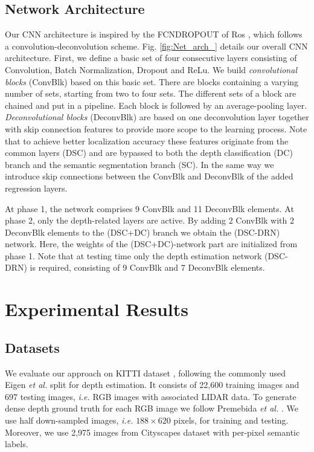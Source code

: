 \documentclass[letterpaper, 10 pt, conference]{ieeeconf}
\newcommand{\ie}{{\em i.e.}}
\newcommand{\etal}{{\em et al.}}
\newcommand{\Fig}[1]{Fig. \ref{fig:#1}}
\begin{document}
\subsection{Network Architecture}
 
Our CNN architecture is inspired by the FCNDROPOUT of Ros \cite{Ros:2016}, which follows a convolution-deconvolution scheme. \Fig{Net_arch_} details our overall CNN architecture. First, we define a basic set of four consecutive layers consisting of Convolution, Batch Normalization, Dropout and ReLu. We build \emph{convolutional blocks} (ConvBlk) based on this basic set. There are blocks containing a varying number of sets, starting from two to four sets. The different sets of a block are chained and put in a pipeline. Each block is followed by an average-pooling layer. \emph{Deconvolutional blocks} (DeconvBlk) are based on one deconvolution layer together with skip connection features to provide more scope to the  learning process. Note that to achieve better localization accuracy these features originate from the common layers (DSC) and are bypassed to both the depth classification (DC) branch and the semantic segmentation branch (SC). In the same way we introduce skip connections between the ConvBlk and DeconvBlk of the added regression layers. 

At phase 1, the network comprises 9 ConvBlk and 11 DeconvBlk elements. At phase 2, only the depth-related layers are active. By adding 2 ConvBlk with 2 DeconvBlk elements to the (DSC+DC) branch we obtain the (DSC-DRN) network. Here, the weights of the (DSC+DC)-network part are initialized from phase 1. Note that at testing time only the depth estimation network (DSC-DRN) is required, consisting of 9 ConvBlk and 7 DeconvBlk elements. 



 
\section{Experimental Results}
\label{sec:experiments}

\subsection{Datasets}

We evaluate our approach on KITTI dataset \cite{Geiger:2013}, following the commonly used Eigen {\etal} \cite{Eigen:2014} split for depth estimation. It consists of 22,600 training images and 697 testing images, {\ie} RGB images with associated LIDAR data. To generate dense depth ground truth for each RGB image we follow Premebida {\etal} \cite{Premebida:2014}. We use half down-sampled images, {\ie} $188 \times 620$ pixels, for training and testing. Moreover, we use 2,975 images from Cityscapes dataset \cite{Cordts:2016} with per-pixel semantic labels. 
\end{document}
